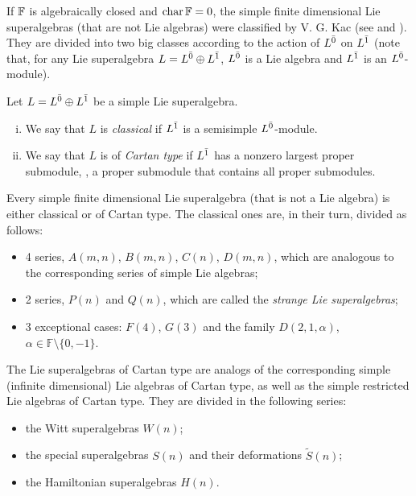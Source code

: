 If $\mathbb{F}$ is algebraically closed and $\operatorname{char} \mathbb{F} = 0$, 
the simple finite dimensional Lie superalgebras (that are not Lie algebras) were classified by V. G. Kac (see \cite{artigokac} and \cite{livrosuperalgebra}). 
They are divided into two big classes according to the action of $L^{\bar0}$ on $L^{\bar1}$ (note that, for any Lie superalgebra $L=L^{\bar0} \oplus L^{\bar1}$, $L^{\bar0}$ is a Lie algebra and $L^{\bar1}$ is an $L^{\bar0}$-module). 

\begin{defi}
	Let $L=L^{\bar0} \oplus L^{\bar1}$ be a simple Lie superalgebra.
	\begin{enumerate}[(i)]
		\item We say that $L$ is \emph{classical} if $L^{\bar1}$ is a semisimple $L^{\bar0}$-module.
		\item We say that $L$ is of \emph{Cartan type} if $L^{\bar1}$ has a nonzero largest proper submodule, \ie, a proper submodule that contains all proper submodules.
	\end{enumerate}
\end{defi}

Every simple finite dimensional Lie superalgebra (that is not a Lie algebra) is either classical or of Cartan type. 
The classical ones are, in their turn, divided as follows:

\begin{itemize}
	\item 4 series, $A(m,n)$, $B(m,n)$, $C(n)$, $D(m,n)$, which are analogous to the corresponding series of simple Lie algebras;

	\item 2 series, $P(n)$ and $Q(n)$, which are called the \emph{strange Lie superalgebras};

	\item 3 exceptional cases: $F(4)$, $G(3)$ and the family $D(2,1,\alpha)$, $\alpha \in \mathbb{F}\setminus \{0,-1\}$.
\end{itemize}

The Lie superalgebras of Cartan type are analogs of the corresponding simple (infinite dimensional) Lie algebras of Cartan type, as well as the simple restricted Lie algebras of Cartan type.
They are divided in the following series:

\begin{itemize}
	\item the Witt superalgebras $W(n)$;
	\item the special superalgebras $S(n)$ and their deformations $\tilde S(n)$;
	\item the Hamiltonian superalgebras $H(n)$.
\end{itemize}

